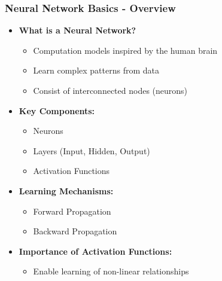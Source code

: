 \documentclass[aspectratio=169]{beamer}
\begin{document}
\begin{frame}[fragile]
    \frametitle{Neural Network Basics - Overview}
    \begin{itemize}
        \item \textbf{What is a Neural Network?}
        \begin{itemize}
            \item Computation models inspired by the human brain
            \item Learn complex patterns from data
            \item Consist of interconnected nodes (neurons)
        \end{itemize}
        
        \item \textbf{Key Components:}
        \begin{itemize}
            \item Neurons
            \item Layers (Input, Hidden, Output)
            \item Activation Functions
        \end{itemize}
        
        \item \textbf{Learning Mechanisms:}
        \begin{itemize}
            \item Forward Propagation
            \item Backward Propagation
        \end{itemize}
        
        \item \textbf{Importance of Activation Functions:}
        \begin{itemize}
            \item Enable learning of non-linear relationships
        \end{itemize}
    \end{itemize}
\end{frame}
\end{document}

